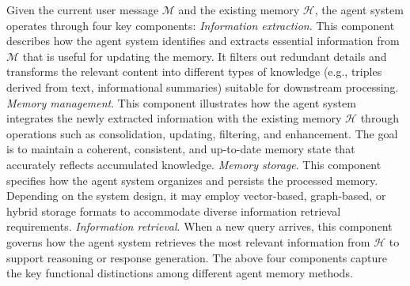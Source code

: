 
Given the current user message $\mathcal{M}$ and the existing memory $\mathcal{H}$, the agent system operates through four key components:
{\Large {}} {\it Information extraction}.
This component describes how the agent system identifies and extracts essential information from $\mathcal{M}$ that is useful for updating the memory. It filters out redundant details and transforms the relevant content into different types of knowledge (e.g., triples derived from text, informational summaries) suitable for downstream processing.
{\Large {}} {\it Memory management}.
This component illustrates how the agent system integrates the newly extracted information with the existing memory $\mathcal{H}$ through operations such as consolidation, updating, filtering, and enhancement. The goal is to maintain a coherent, consistent, and up-to-date memory state that accurately reflects accumulated knowledge.
{\Large {}} {\it Memory storage}.
This component specifies how the agent system organizes and persists the processed memory. Depending on the system design, it may employ vector-based, graph-based, or hybrid storage formats to accommodate diverse information retrieval requirements.
{\Large {}} {\it Information retrieval}.
When a new query arrives, this component governs how the agent system retrieves the most relevant information from $\mathcal{H}$ to support reasoning or response generation. 
The above four components capture the key functional distinctions among different agent memory methods.

